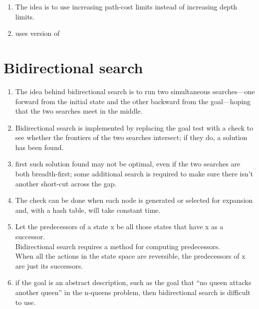 \begin{enumerate}
    \item The idea is to use increasing path-cost limits instead of increasing depth limits.

    \item uses  version of 
\end{enumerate}


\section{Bidirectional search \cite{aci-1}} \label{Bidirectional search}

\begin{enumerate}
    \item The idea behind bidirectional search is to run two simultaneous searches—one forward from the initial state and the other backward from the goal—hoping that the two searches meet in the middle.

    \item Bidirectional search is implemented by replacing the goal test with a check to see whether the frontiers of the two searches intersect; if they do, a solution has been found.

    \item first such solution found may not be optimal, even if the two searches are both breadth-first; some additional search is required to make sure there isn’t another short-cut across the gap.

    \item The check can be done when each node is generated or selected for expansion and, with a hash table, will take constant time.

    \item Let the predecessors of a state x be all those states that have x as a successor.\\
    Bidirectional search requires a method for computing predecessors.\\
    When all the actions in the state space are reversible, the predecessors of x are just its successors.

    \item  if the goal is an abstract description, such as the goal that “no queen attacks another queen” in the n-queens problem, then bidirectional search is difficult to use.
\end{enumerate}

